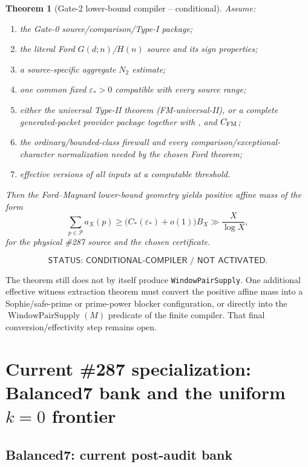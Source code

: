 \documentclass[11pt]{article}
\newtheorem{theorem}{Theorem}[section]
\theoremstyle{definition}
\newcommand{\1}{\mathbf 1}
\newcommand{\WPS}{\operatorname{WindowPairSupply}}
\newcommand{\status}[1]{\textsf{#1}}
\begin{document}
\begin{theorem}[Gate-2 lower-bound compiler -- conditional]
Assume:
\begin{enumerate}[label=\textup{G2.\arabic*},leftmargin=2.0em]
\item the Gate-0 source/comparison/Type-I package;
\item the literal Ford $G(d;n)$/$H(n)$ source and its sign properties;
\item a source-specific aggregate $N_2$ estimate;
\item one common fixed $\varepsilon_\ast>0$ compatible with every source range;
\item either the universal Type-II theorem (FM-universal-II), or a complete
generated-packet provider package together with
,
 and $C_{\rm FM}$;
\item the ordinary/bounded-class firewall and every comparison/exceptional-character
normalization needed by the chosen Ford theorem;
\item effective versions of all inputs at a computable threshold.
\end{enumerate}
Then the Ford--Maynard lower-bound geometry yields positive affine mass of the form
\[
\boxed{
\sum_{p\in\mathcal P}a_X(p)
\ge
\bigl(C_\ast(\varepsilon_\ast)+o(1)\bigr)B_X
\gg \frac{X}{\log X},
}
\tag{G2-positive}
\]
for the physical \#287 source and the chosen certificate.
\end{theorem}

\[
\status{STATUS: CONDITIONAL-COMPILER / NOT ACTIVATED.}
\]

The theorem still does not by itself produce \texttt{WindowPairSupply}.  One additional effective witness
extraction theorem must convert the positive affine mass into a Sophie/safe-prime or
prime-power blocker configuration, or directly into the $\WPS(M)$ predicate of the finite
compiler.  That final conversion/effectivity step remains open.

\section{Current \#287 specialization: Balanced7 bank and the uniform $k=0$ frontier}\label{sec:3221-current}

\subsection{Balanced7: current post-audit bank}
\end{document}
